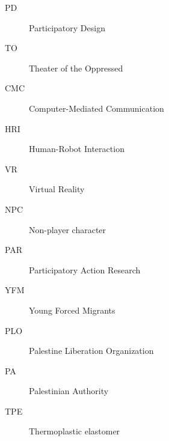 \documentclass[dissertation,math,vertlayout,pdfa,colorlinks]{aaltoseries}
\begin{document}
\clearpage
\tableofcontents


\listofpublications

\listoffigures
\listoftables


\abbreviations

\begin{description}
\item[PD] Participatory Design
\item[TO] Theater of the Oppressed
\item[CMC] Computer-Mediated Communication
\item[HRI] Human-Robot Interaction
\item[VR] Virtual Reality
\item[NPC] Non-player character
\item[PAR] Participatory Action Research
\item[YFM] Young Forced Migrants
\item[PLO] Palestine Liberation Organization
\item[PA] Palestinian Authority
\item[TPE] Thermoplastic elastomer
\end{description}


\end{document}
